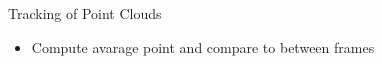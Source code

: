 
\begin{frame}{Tracking of Point Clouds}
	\begin{itemize}
	\item Compute avarage point and compare to between frames
	\end{itemize}
\end{frame}
